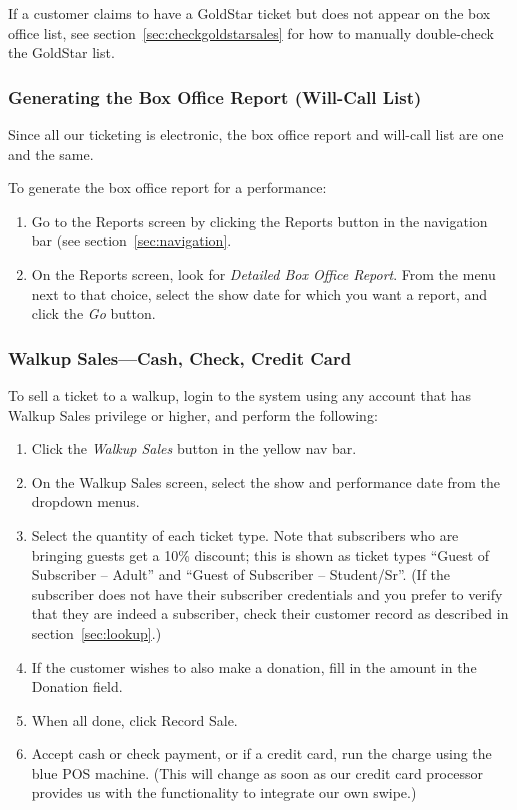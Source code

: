 If a customer claims to have a GoldStar ticket but does not appear on
the box office list, see section~\ref{sec:checkgoldstarsales} for how to
manually double-check the GoldStar list.

\subsubsection{Generating the Box Office Report (Will-Call List)}

Since all our ticketing is electronic, the box office report and
will-call list are one and the same.

To generate the box office report for a performance:

\begin{enumerate}
\item Go to the Reports screen by clicking the Reports button in the
  navigation bar (see section~\ref{sec:navigation}.
\item On the Reports screen, look for \emph{Detailed Box Office
    Report}.  From the menu next to that choice, select the show date
  for which you want a report, and click the \emph{Go} button.
\end{enumerate}

\subsubsection{Walkup Sales---Cash, Check, Credit Card}
\label{sec:walkupsales}

To sell a ticket to a walkup, login to the system using any account that
has Walkup Sales privilege or higher, and perform the following:

\begin{enumerate}
\item Click the \emph{Walkup Sales} button in the yellow nav bar.
\item On the Walkup Sales screen, select the show and performance date
  from the dropdown menus.
\item Select the quantity of each ticket type. Note that subscribers who
  are bringing guests get a 10\% discount; this is shown as ticket types
  ``Guest of Subscriber -- Adult'' and ``Guest of Subscriber --
  Student/Sr''.  (If the subscriber does not have their subscriber
  credentials  and you prefer to verify that they are
  indeed a subscriber, check their customer record as described in
  section~\ref{sec:lookup}.)
\item If the customer wishes to also make a donation, fill in the amount
  in the Donation field.
\item When all done, click Record Sale.
\item Accept cash or check payment, or if a credit card, run the charge
  using the blue POS machine.  (This will change as soon as our credit
  card processor provides us with the functionality to integrate our own
  swipe.) 
\end{enumerate}

